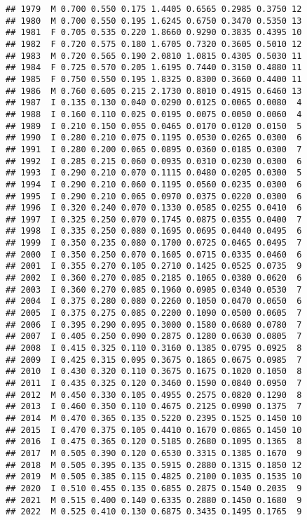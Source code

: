 \documentclass[
]{article}
\begin{document}
\begin{verbatim}
## 1979  M 0.700 0.550 0.175 1.4405 0.6565 0.2985 0.3750 12
## 1980  M 0.700 0.550 0.195 1.6245 0.6750 0.3470 0.5350 13
## 1981  F 0.705 0.535 0.220 1.8660 0.9290 0.3835 0.4395 10
## 1982  F 0.720 0.575 0.180 1.6705 0.7320 0.3605 0.5010 12
## 1983  M 0.720 0.565 0.190 2.0810 1.0815 0.4305 0.5030 11
## 1984  F 0.725 0.570 0.205 1.6195 0.7440 0.3150 0.4880 11
## 1985  F 0.750 0.550 0.195 1.8325 0.8300 0.3660 0.4400 11
## 1986  M 0.760 0.605 0.215 2.1730 0.8010 0.4915 0.6460 13
## 1987  I 0.135 0.130 0.040 0.0290 0.0125 0.0065 0.0080  4
## 1988  I 0.160 0.110 0.025 0.0195 0.0075 0.0050 0.0060  4
## 1989  I 0.210 0.150 0.055 0.0465 0.0170 0.0120 0.0150  5
## 1990  I 0.280 0.210 0.075 0.1195 0.0530 0.0265 0.0300  6
## 1991  I 0.280 0.200 0.065 0.0895 0.0360 0.0185 0.0300  7
## 1992  I 0.285 0.215 0.060 0.0935 0.0310 0.0230 0.0300  6
## 1993  I 0.290 0.210 0.070 0.1115 0.0480 0.0205 0.0300  5
## 1994  I 0.290 0.210 0.060 0.1195 0.0560 0.0235 0.0300  6
## 1995  I 0.290 0.210 0.065 0.0970 0.0375 0.0220 0.0300  6
## 1996  I 0.320 0.240 0.070 0.1330 0.0585 0.0255 0.0410  6
## 1997  I 0.325 0.250 0.070 0.1745 0.0875 0.0355 0.0400  7
## 1998  I 0.335 0.250 0.080 0.1695 0.0695 0.0440 0.0495  6
## 1999  I 0.350 0.235 0.080 0.1700 0.0725 0.0465 0.0495  7
## 2000  I 0.350 0.250 0.070 0.1605 0.0715 0.0335 0.0460  6
## 2001  I 0.355 0.270 0.105 0.2710 0.1425 0.0525 0.0735  9
## 2002  I 0.360 0.270 0.085 0.2185 0.1065 0.0380 0.0620  6
## 2003  I 0.360 0.270 0.085 0.1960 0.0905 0.0340 0.0530  7
## 2004  I 0.375 0.280 0.080 0.2260 0.1050 0.0470 0.0650  6
## 2005  I 0.375 0.275 0.085 0.2200 0.1090 0.0500 0.0605  7
## 2006  I 0.395 0.290 0.095 0.3000 0.1580 0.0680 0.0780  7
## 2007  I 0.405 0.250 0.090 0.2875 0.1280 0.0630 0.0805  7
## 2008  I 0.415 0.325 0.110 0.3160 0.1385 0.0795 0.0925  8
## 2009  I 0.425 0.315 0.095 0.3675 0.1865 0.0675 0.0985  7
## 2010  I 0.430 0.320 0.110 0.3675 0.1675 0.1020 0.1050  8
## 2011  I 0.435 0.325 0.120 0.3460 0.1590 0.0840 0.0950  7
## 2012  M 0.450 0.330 0.105 0.4955 0.2575 0.0820 0.1290  8
## 2013  I 0.460 0.350 0.110 0.4675 0.2125 0.0990 0.1375  7
## 2014  M 0.470 0.365 0.135 0.5220 0.2395 0.1525 0.1450 10
## 2015  I 0.470 0.375 0.105 0.4410 0.1670 0.0865 0.1450 10
## 2016  I 0.475 0.365 0.120 0.5185 0.2680 0.1095 0.1365  8
## 2017  M 0.505 0.390 0.120 0.6530 0.3315 0.1385 0.1670  9
## 2018  M 0.505 0.395 0.135 0.5915 0.2880 0.1315 0.1850 12
## 2019  M 0.505 0.385 0.115 0.4825 0.2100 0.1035 0.1535 10
## 2020  I 0.510 0.455 0.135 0.6855 0.2875 0.1540 0.2035  9
## 2021  M 0.515 0.400 0.140 0.6335 0.2880 0.1450 0.1680  9
## 2022  M 0.525 0.410 0.130 0.6875 0.3435 0.1495 0.1765  9

\end{verbatim}
\end{document}
